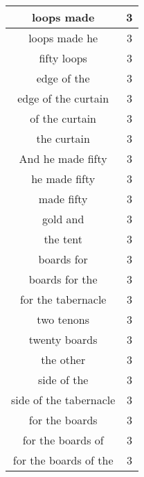 \begin{center}
\begin{longtable}{|c|c|}
loops made & 3\\ \hline 
loops made he & 3\\ \hline 
fifty loops & 3\\ \hline 
edge of the & 3\\ \hline 
edge of the curtain & 3\\ \hline 
of the curtain & 3\\ \hline 
the curtain & 3\\ \hline 
And he made fifty & 3\\ \hline 
he made fifty & 3\\ \hline 
made fifty & 3\\ \hline 
gold and & 3\\ \hline 
the tent & 3\\ \hline 
boards for & 3\\ \hline 
boards for the & 3\\ \hline 
for the tabernacle & 3\\ \hline 
two tenons & 3\\ \hline 
twenty boards & 3\\ \hline 
the other & 3\\ \hline 
side of the & 3\\ \hline 
side of the tabernacle & 3\\ \hline 
for the boards & 3\\ \hline 
for the boards of & 3\\ \hline 
for the boards of the & 3\\ \hline 
\end{longtable}
\end{center}





